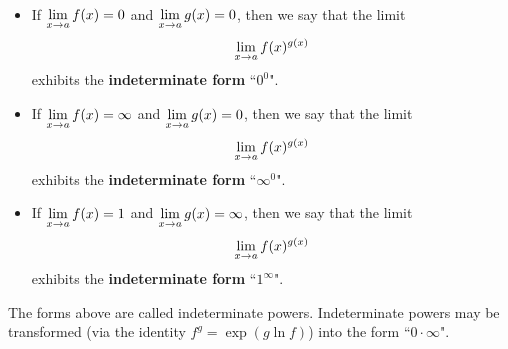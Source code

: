 \newpage

\begin{definition}\,
\begin{itemize}
\item If $\displaystyle\lim_{x\to a}f(x) = 0$ and $\displaystyle\lim_{x\to a}g(x) = 0$, then we say that the limit $$\displaystyle\lim_{x\to a}f(x)^{g(x)}$$ exhibits the \textbf{indeterminate form} ``$0^0$".
\item If $\displaystyle\lim_{x\to a}f(x) = \infty$ and $\displaystyle\lim_{x\to a}g(x) = 0$, then we say that the limit $$\displaystyle\lim_{x\to a}f(x)^{g(x)}$$ exhibits the \textbf{indeterminate form} ``$\infty^0$".
\item If $\displaystyle\lim_{x\to a}f(x) = 1$ and $\displaystyle\lim_{x\to a}g(x) = \infty$, then we say that the limit $$\displaystyle\lim_{x\to a}f(x)^{g(x)}$$ exhibits the \textbf{indeterminate form} ``$1^{\infty}$".
\end{itemize}
\end{definition}

\begin{remark}
The forms above are called indeterminate powers.
Indeterminate powers may be transformed (via the identity $f^g = \exp(g\ln f)$) into the form ``$0\cdot \infty$".
\end{remark}

